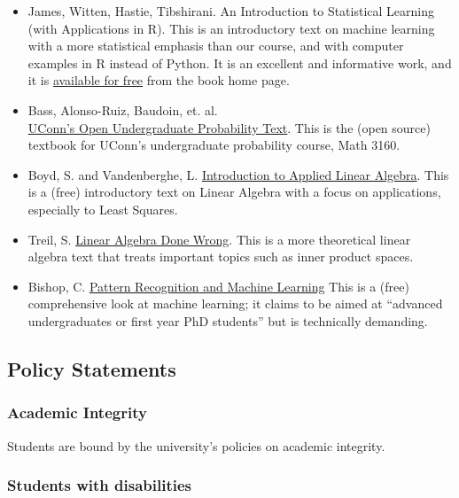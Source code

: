 \documentclass[
]{article}
\begin{document}
\begin{itemize}
\item
  James, Witten, Hastie, Tibshirani. An Introduction to Statistical
  Learning (with Applications in R). This is an introductory text on
  machine learning with a more statistical emphasis than our course, and
  with computer examples in R instead of Python. It is an excellent and
  informative work, and it is \href{https://statlearning.com/}{available
  for free} from the book home page.
\item
  Bass, Alonso-Ruiz, Baudoin, et. al.\\
  \href{https://probability.oer.math.uconn.edu/3160-oer/}{UConn's Open
  Undergraduate Probability Text}. This is the (open source) textbook
  for UConn's undergraduate probability course, Math 3160.
\item
  Boyd, S. and Vandenberghe, L.
  \href{https://web.stanford.edu/~boyd/vmls/}{Introduction to Applied
  Linear Algebra}. This is a (free) introductory text on Linear Algebra
  with a focus on applications, especially to Least Squares.
\item
  Treil, S.
  \href{https://www.math.brown.edu/streil/papers/LADW/LADW.html}{Linear
  Algebra Done Wrong}. This is a more theoretical linear algebra text
  that treats important topics such as inner product spaces.
\item
  Bishop, C.
  \href{https://www.microsoft.com/en-us/research/people/cmbishop/prml-book/}{Pattern
  Recognition and Machine Learning} This is a (free) comprehensive look
  at machine learning; it claims to be aimed at ``advanced
  undergraduates or first year PhD students'' but is technically
  demanding.
\end{itemize}

\hypertarget{policy-statements}{%
\subsection{Policy Statements}\label{policy-statements}}

\hypertarget{academic-integrity}{%
\subsubsection{Academic Integrity}\label{academic-integrity}}

Students are bound by the university's policies on academic integrity.

\hypertarget{students-with-disabilities}{%
\subsubsection{Students with
disabilities}\label{students-with-disabilities}}
\end{document}
